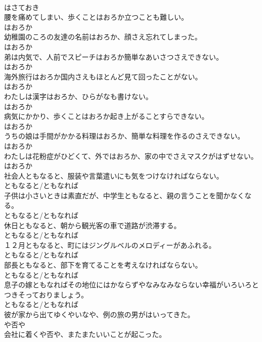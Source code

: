 \documentclass[8pt]{extreport}
\begin{document}
\begin{CJK}{UTF8}{min}
\\	はさておき	
\\	腰を痛めてしまい、歩くことはおろか立つことも難しい。	
\\	はおろか	
\\	幼稚園のころの友達の名前はおろか、顔さえ忘れてしまった。	
\\	はおろか	
\\	弟は内気で、人前でスピーチはおろか簡単なあいさつさえできない。	
\\	はおろか	
\\	海外旅行はおろか国内さえもほとんど見て回ったことがない。	
\\	はおろか	
\\	わたしは漢字はおろか、ひらがなも書けない。	
\\	はおろか	
\\	病気にかかり、歩くことはおろか起き上がることすらできない。	
\\	はおろか	
\\	うちの娘は手間がかかる料理はおろか、簡単な料理を作るのさえできない。	
\\	はおろか	
\\	わたしは花粉症がひどくて、外ではおろか、家の中でさえマスクがはずせない。	
\\	はおろか	
\\	社会人ともなると、服装や言葉遣いにも気をつけなければならない。	
\\	ともなると/ともなれば	
\\	子供は小さいときは素直だが、中学生ともなると、親の言うことを聞かなくなる。	
\\	ともなると/ともなれば	
\\	休日ともなると、朝から観光客の車で道路が渋滞する。	
\\	ともなると/ともなれば	
\\	１２月ともなると、町にはジングルベルのメロディーがあふれる。	
\\	ともなると/ともなれば	
\\	部長ともなると、部下を育てることを考えなければならない。	
\\	ともなると/ともなれば	
\\	息子の嫁ともなればその地位にはかならずやなみなみならない幸福がいろいろとつきそっておりましょう。	
\\	ともなると/ともなれば	
\\	彼が家から出てゆくやいなや、例の旅の男がはいってきた。	
\\	や否や	
\\	会社に着くや否や、またまたいいことが起こった。	

\end{CJK}
\end{document}
